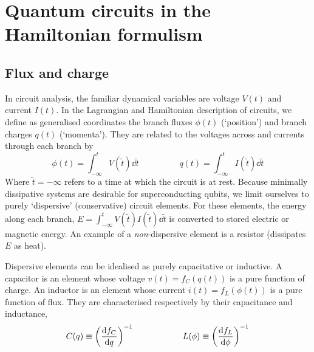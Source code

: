 \documentclass[11pt]{article}
\begin{document}

\section{Quantum circuits in the Hamiltonian formulism}

\subsection{Flux and charge}

In circuit analysis, the familiar dynamical variables are voltage $V(t)$ and current $I(t)$. In the Lagrangian and Hamiltonian description of circuits, we define as generalised coordinates the branch fluxes $\phi(t)$ (`position') and branch charges $q(t)$ (`momenta'). They are related to the voltages across and currents through each branch by
\begin{equation}
\phi(t) = \int_{-\infty}^t V(\tilde{t}) \dd{\tilde{t}}
\hspace{2cm}
q(t) = \int_{-\infty}^t I(\tilde{t}) \dd{\tilde{t}}
\end{equation}
Where $\tilde{t} = -\infty$ refers to a time at which the circuit is at rest. Because minimally dissipative systems are desirable for superconducting qubits, we limit ourselves to purely `dispersive' (conservative) circuit elements. For these elements, the energy along each branch, $E = \int_{-\infty}^t V(\tilde{t}) I(\tilde{t}) \dd{\tilde{t}}$ is converted to stored electric or magnetic energy. An example of a \emph{non}-dispersive element is a resistor (dissipates $E$ as heat).

Dispersive elements can be idealised as purely capacitative or inductive. A capacitor is an element whose voltage $v(t) = f_C(q(t))$ is a pure function of charge. An inductor is an element whose current $i(t) = f_L(\phi(t))$ is a pure function of flux. They are characterised respectively by their capacitance and inductance,
\begin{equation}
C(q) \equiv \left( \dv{f_C}{q} \right)^{-1}
\hspace{2cm}
L(\phi) \equiv \left( \dv{f_L}{\phi} \right)^{-1}
\end{equation}
\end{document}
